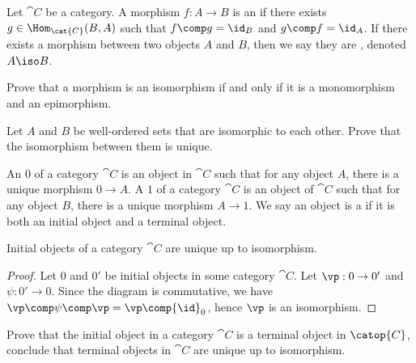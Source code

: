 \documentclass[10pt]{article}
\begin{document}
\begin{definition}
    Let $\cat{C}$ be a category. A morphism $f:A\to B$ is an  if there exists $g\in{\Hom}_{\cat{C}}(B,A)$ such that $f\comp g={\id}_{B}$ and $g\comp f={\id}_{A}$. If there exists a morphism between two objects $A$ and $B$, then we say they are , denoted $A\iso B$.
\end{definition}
\begin{problem}
    Prove that a morphism is an isomorphism if and only if it is a monomorphism and an epimorphism.
\end{problem}
\begin{problem}
    Let $A$ and $B$ be well-ordered sets that are isomorphic to each other. Prove that the isomorphism between them is unique.
\end{problem}
\begin{definition}
    An  $0$ of a category $\cat{C}$ is an object in $\cat{C}$ such that for any object $A$, there is a unique morphism $0\to A$. A  $1$ of a category $\cat{C}$ is an object of $\cat{C}$ such that for any object $B$, there is a unique morphism $A\to 1$. We say an object is a  if it is both an initial object and a terminal object.
\end{definition}
\begin{proposition}
    Initial objects of a category $\cat{C}$ are unique up to isomorphism.
\end{proposition}
\begin{proof}
    Let $0$ and $0'$ be initial objects in some category $\cat{C}$. Let $\vp:0\to 0'$ and $\psi:0'\to 0$. Since the diagram is commutative, we have $\vp\comp\psi\comp\vp=\vp\comp{\id}_{0}$, hence $\vp$ is an isomorphism. 
\end{proof}
\begin{center}
\end{center}
\begin{problem}
    Prove that the initial object in a category $\cat{C}$ is a terminal object in $\catop{C}$, conclude that terminal objects in $\cat{C}$ are unique up to isomorphism.
\end{problem}
\end{document}
